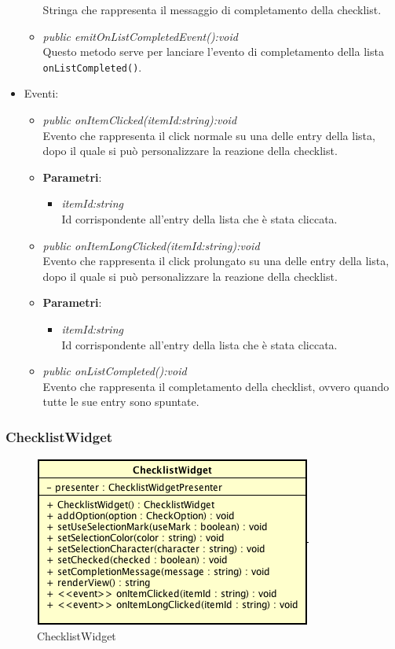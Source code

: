 \begin{itemize}
\begin{itemize}
{\begin{itemize}
		Stringa che rappresenta il messaggio di completamento della checklist.
		\end{itemize}}
	\item \textit{public emitOnListCompletedEvent():void}\\
	Questo metodo serve per lanciare l'evento di completamento della lista \texttt{onListCompleted()}.
	\end{itemize}
\item{Eventi}:
	\begin{itemize}
	\item \textit{public onItemClicked(itemId:string):void}\\
	Evento che rappresenta il click normale su una delle entry della lista, dopo il quale si può personalizzare la reazione della checklist.
		\item{\textbf{Parametri}: \begin{itemize}
		\item \textit{itemId:string}\\
		Id corrispondente all'entry della lista che è stata cliccata.
		\end{itemize}}
	\item \textit{public onItemLongClicked(itemId:string):void}\\
	Evento che rappresenta il click prolungato su una delle entry della lista, dopo il quale si può personalizzare la reazione della checklist.
		\item{\textbf{Parametri}: \begin{itemize}
		\item \textit{itemId:string}\\
		Id corrispondente all'entry della lista che è stata cliccata.
		\end{itemize}}
	\item \textit{public onListCompleted():void}\\
	Evento che rappresenta il completamento della checklist, ovvero quando tutte le sue entry sono spuntate.
	\end{itemize}
\end{itemize}

\subsubsection{ChecklistWidget}

\label{ChecklistWidget}
\begin{figure}[ht]
	\centering
	\includegraphics[scale=0.5]{Sezioni/SottosezioniST/img/ChecklistWidget.png}
	\caption{ChecklistWidget}
\end{figure}

